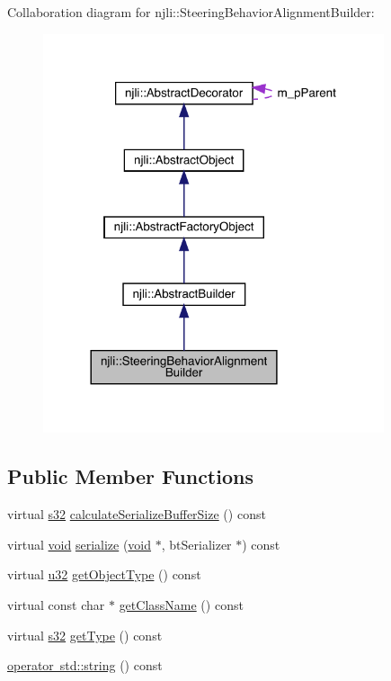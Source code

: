 Collaboration diagram for njli\+:\+:Steering\+Behavior\+Alignment\+Builder\+:\nopagebreak
\begin{figure}[H]
\begin{center}
\leavevmode
\includegraphics[width=284pt]{classnjli_1_1_steering_behavior_alignment_builder__coll__graph}
\end{center}
\end{figure}
\subsection*{Public Member Functions}
\begin{DoxyCompactItemize}
\item 
virtual \mbox{\hyperlink{_util_8h_aa62c75d314a0d1f37f79c4b73b2292e2}{s32}} \mbox{\hyperlink{classnjli_1_1_steering_behavior_alignment_builder_a709481f46937533d73b1a0246ea76993}{calculate\+Serialize\+Buffer\+Size}} () const
\item 
virtual \mbox{\hyperlink{_thread_8h_af1e856da2e658414cb2456cb6f7ebc66}{void}} \mbox{\hyperlink{classnjli_1_1_steering_behavior_alignment_builder_a3cbfb826f38059003573c24a1f86b1ea}{serialize}} (\mbox{\hyperlink{_thread_8h_af1e856da2e658414cb2456cb6f7ebc66}{void}} $\ast$, bt\+Serializer $\ast$) const
\item 
virtual \mbox{\hyperlink{_util_8h_a10e94b422ef0c20dcdec20d31a1f5049}{u32}} \mbox{\hyperlink{classnjli_1_1_steering_behavior_alignment_builder_a584466cb5cda7cddd21ee1a2ca8eb9ee}{get\+Object\+Type}} () const
\item 
virtual const char $\ast$ \mbox{\hyperlink{classnjli_1_1_steering_behavior_alignment_builder_a237e899522da16f145be4e755a1b0c8c}{get\+Class\+Name}} () const
\item 
virtual \mbox{\hyperlink{_util_8h_aa62c75d314a0d1f37f79c4b73b2292e2}{s32}} \mbox{\hyperlink{classnjli_1_1_steering_behavior_alignment_builder_aeae4d890010be3da48f8221714d59c50}{get\+Type}} () const
\item 
\mbox{\hyperlink{classnjli_1_1_steering_behavior_alignment_builder_ada8a4f78156236023d2c214d25e80138}{operator std\+::string}} () const
\end{DoxyCompactItemize}
